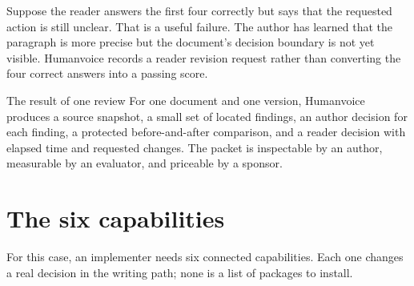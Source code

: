 Suppose the reader answers the first four correctly but says that the requested
action is still unclear. That is a useful failure. The author has learned that
the paragraph is more precise but the document's decision boundary is not yet
visible. Humanvoice records a reader revision request rather than converting
the four correct answers into a passing score.

\begin{takeawaybox}{The result of one review}
For one document and one version, Humanvoice produces a source snapshot, a
small set of located findings, an author decision for each finding, a protected
before-and-after comparison, and a reader decision with elapsed time and
requested changes. The packet is inspectable by an author, measurable by an
evaluator, and priceable by a sponsor.
\end{takeawaybox}

\section{The six capabilities}

For this case, an implementer needs six connected capabilities. Each one
changes a real decision in the writing path; none is a list of packages to
install.


